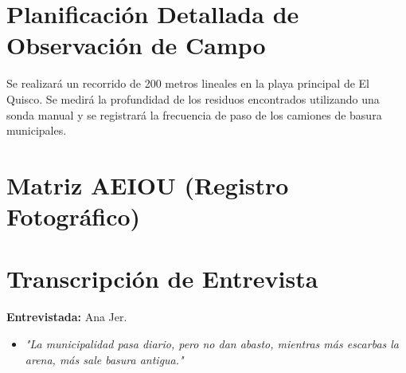 \newpage
\begin{appendixd}
	\section{Planificación Detallada de Observación de Campo}
	Se realizará un recorrido de 200 metros lineales en la playa principal de El Quisco. Se medirá la profundidad de los residuos encontrados utilizando una sonda manual y se registrará la frecuencia de paso de los camiones de basura municipales.

	\section{Matriz AEIOU (Registro Fotográfico)}

	\section{Transcripción de Entrevista}
	\textbf{Entrevistada:} Ana Jer.
	\begin{itemize}
		\item \textit{"La municipalidad pasa diario, pero no dan abasto, mientras más escarbas la arena, más sale basura antigua."}
	\end{itemize}
\end{appendixd}

